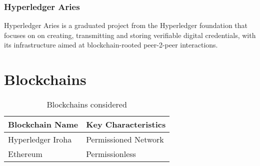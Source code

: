 \subsubsection{Hyperledger Aries} %
\label{sec:Hyperledger Aries}

Hyperledger Aries is a graduated project from the Hyperledger foundation that focuses on on creating, transmitting and
storing verifiable digital credentials, with its infrastructure aimed at blockchain-rooted peer-2-peer interactions.


\section{Blockchains} %
\label{sec:Blockchains}
\begin{table}
	\caption{Blockchains considered}
	\label{tab:Blockchains considered}
	\begin{center}
		\begin{tabular}[c]{|l|l|}
			\hline
			\multicolumn{1}{|c|}{\textbf{Blockchain Name}} & Key Characteristics  \\
			\hline
			Hyperledger Iroha \cite{hyperledger:wiki}      & Permissioned Network \\
			\hline
			Ethereum                                       & Permissionless       \\
			\hline
		\end{tabular}
	\end{center}
\end{table}


